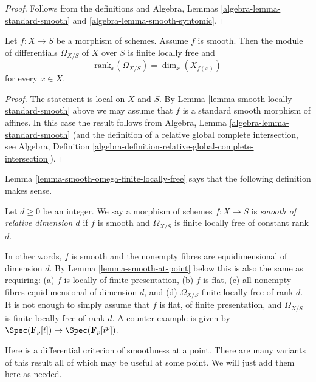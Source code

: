 \begin{proof}
Follows from the definitions and
Algebra, Lemmas \ref{algebra-lemma-standard-smooth}
and \ref{algebra-lemma-smooth-syntomic}.
\end{proof}

\begin{lemma}
\label{lemma-smooth-omega-finite-locally-free}
Let $f : X \to S$ be a morphism of schemes.
Assume $f$ is smooth.
Then the module of differentials $\Omega_{X/S}$ of $X$ over $S$
is finite locally free and
$$
\text{rank}_x(\Omega_{X/S}) = \dim_x(X_{f(x)})
$$
for every $x \in X$.
\end{lemma}

\begin{proof}
The statement is local on $X$ and $S$.
By Lemma \ref{lemma-smooth-locally-standard-smooth}
above we may assume that $f$ is a standard smooth morphism of affines.
In this case the result follows from
Algebra, Lemma \ref{algebra-lemma-standard-smooth}
(and the definition of a relative global complete intersection, see
Algebra,
Definition \ref{algebra-definition-relative-global-complete-intersection}).
\end{proof}

\noindent
Lemma \ref{lemma-smooth-omega-finite-locally-free}
says that the following definition makes sense.

\begin{definition}
\label{definition-smooth-relative-dimension}
Let $d \geq 0$ be an integer. We say a morphism of schemes $f : X \to S$
is {\it smooth of relative dimension $d$} if $f$ is smooth and
$\Omega_{X/S}$ is finite locally free of constant rank $d$.
\end{definition}

\noindent
In other words, $f$ is smooth and the nonempty fibres are equidimensional
of dimension $d$. By Lemma \ref{lemma-smooth-at-point} below this is also
the same as requiring: (a) $f$ is locally of finite presentation, (b) $f$ is
flat, (c) all nonempty fibres equidimensional of dimension $d$, and (d)
$\Omega_{X/S}$ finite locally free of rank $d$. It is not enough to simply
assume that $f$ is flat, of finite presentation, and $\Omega_{X/S}$ is
finite locally free of rank $d$. A counter example is given by
$\Spec(\mathbf{F}_p[t]) \to \Spec(\mathbf{F}_p[t^p])$.

\medskip\noindent
Here is a differential criterion of smoothness at a point.
There are many variants of this result
all of which may be useful at some point. We will just add them
here as needed.

